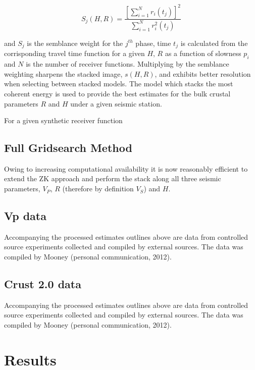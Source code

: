 \documentclass[draft, 12pt]{article}
\begin{document}
\begin{equation}
S_j(H,R) = \frac {\left[ \sum_{i=1}^N r_i(t_j) \right]^2}
                 { \sum_{i=1}^N r_i^2(t_j) }
\end{equation}

and $S_j$ is the semblance weight for the $j^{th}$ phase, time $t_j$ is calculated from the corrisponding travel time function for a given $H$, $R$ as a function of slowness $p_i$ and $N$ is the number of receiver functions. Multiplying by the semblance weighting sharpens the stacked image, $s(H,R)$, and exhibits better resolution when selecting between stacked models. The model which stacks the most coherent energy is used to provide the best estimates for the bulk crustal parameters $R$ and $H$ under a given seismic station.

  For a given synthetic receiver function
\subsection{Full Gridsearch Method}

  Owing to increasing computational availability it is now reasonably efficient to extend the ZK approach and perform the stack along all three seismic parameters, $V_P$, $R$ (therefore by definition $V_S$) and $H$.

\subsection{Vp data}
   Accompanying the processed estimates outlines above are data from controlled source experiments collected and compiled by external sources. The data was compiled by Mooney (personal communication, 2012).

\subsection{Crust 2.0 data}
   Accompanying the processed estimates outlines above are data from controlled source experiments collected and compiled by external sources. The data was compiled by Mooney (personal communication, 2012).


\section{Results}
\end{document}
